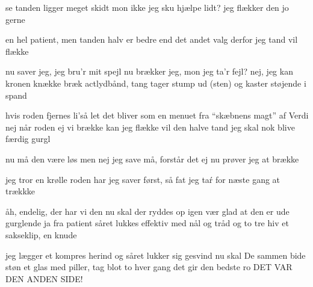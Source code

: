 \documentclass[a4paper,11pt]{article}
\begin{document}
\begin{song}
se tanden ligger meget skidt 
mon ikke jeg sku hjælpe lidt?
jeg flækker den jo gerne 

en hel patient, men tanden halv 
er bedre end det andet valg
derfor jeg tand vil flække 

nu saver jeg, jeg bru'r mit spejl
nu brækker jeg, mon jeg ta'r fejl? 
nej, jeg kan kronen knække
bræk act{lydbånd, tang tager stump ud (sten) og kaster støjende i spand}

hvis roden fjernes li'så let
det bliver som en menuet
fra ``skæbnens magt'' af Verdi
nej 
når roden ej vi brække kan
jeg flække vil den halve tand
jeg skal nok blive færdig 
 gurgl 

nu må den være løs men nej
jeg save må, forstår det ej
nu prøver jeg at brække 

jeg tror en krølle roden har
jeg saver først, så fat jeg taŕ
for næste gang at trækkke 

åh, endelig, der har vi den 
nu skal der ryddes op igen 
vær glad at den er ude 
gurglende ja fra patient
såret lukkes effektiv
med nål og tråd og to tre hiv
et sakseklip, en knude

jeg lægger et kompres herind
og såret lukker sig gesvind
nu skal De sammen bide 
 støn
et glas med piller, tag blot to
hver gang det gir den bedste ro
DET VAR DEN ANDEN SIDE! 
\end{song}
\end{document}
